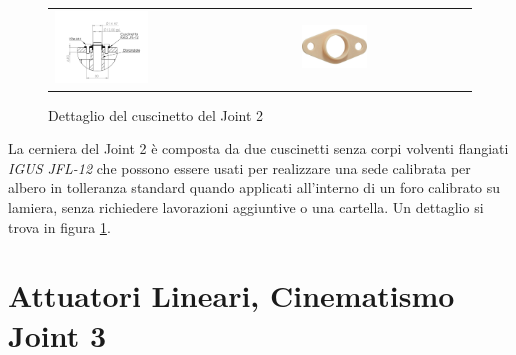 \documentclass[%
corpo=11pt,
twoside,
 stile=classica,
oldstyle,
greek,%
]{toptesi}
\begin{document}
		\begin{figure} [!ht]
		\centering
			\begin{tabular}{ll}
				\includegraphics[width=0.4\textwidth]{Screen/cuscinetto.png}
				&
				\includegraphics[width=0.4\textwidth]{image/jfl12.jpg}
			\end{tabular}				
		\caption{Dettaglio del cuscinetto del Joint 2}
		\label{fig:cuscinetto_foto}
		\end{figure}		
		
		La cerniera del Joint 2 è composta da due cuscinetti senza corpi volventi flangiati \textit{IGUS JFL-12} che possono essere usati per realizzare una sede calibrata per albero in tolleranza standard quando applicati all'interno di un foro calibrato su lamiera, senza richiedere lavorazioni aggiuntive o una cartella. Un dettaglio si trova in figura \ref{fig:cuscinetto_foto}.
	
		
	
	
	\section{Attuatori Lineari, Cinematismo Joint 3}
	
\end{document}
